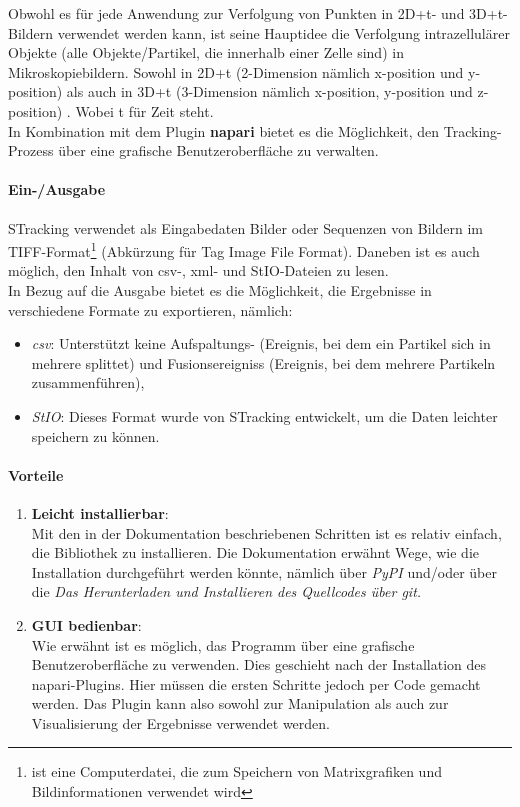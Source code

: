 Obwohl es für jede Anwendung zur Verfolgung von Punkten in 2D+t- und 3D+t-Bildern verwendet werden kann, ist seine Hauptidee die Verfolgung intrazellulärer Objekte (alle Objekte/Partikel, die innerhalb einer Zelle sind) in Mikroskopiebildern. Sowohl in 2D+t (2-Dimension nämlich x-position und y-position) als auch in 3D+t (3-Dimension nämlich x-position, y-position und z-position) \cite{prigent_2020}. Wobei t für Zeit steht.\\
In Kombination mit dem Plugin \textbf{napari}\cite{prigent_2021_napari} bietet es die Möglichkeit, den Tracking-Prozess über eine grafische Benutzeroberfläche zu verwalten.


\paragraph{Ein-/Ausgabe \\} 
    STracking verwendet als Eingabedaten Bilder oder Sequenzen von Bildern im TIFF-Format\footnote{ist eine Computerdatei, die zum Speichern von Matrixgrafiken und Bildinformationen verwendet wird} (Abkürzung für Tag Image File Format). Daneben ist es auch möglich, den Inhalt von csv-, xml- und StIO-Dateien zu lesen.\\

In Bezug auf die Ausgabe bietet es die Möglichkeit, die Ergebnisse in verschiedene Formate zu exportieren, nämlich:
\begin{itemize}
\item \textit{csv}: Unterstützt keine Aufspaltungs- (Ereignis, bei dem ein Partikel sich in mehrere splittet) und Fusionsereigniss (Ereignis, bei dem mehrere Partikeln zusammenführen),
\item \textit{StIO}: Dieses Format wurde von STracking entwickelt, um die Daten leichter speichern zu können.
\end{itemize}

	\paragraph{Vorteile}
		\begin{enumerate}
    			\item \textbf{Leicht installierbar}:\\
				Mit den in der Dokumentation beschriebenen Schritten ist es relativ einfach, die Bibliothek zu installieren. Die Dokumentation erwähnt Wege, wie die Installation durchgeführt werden könnte, nämlich über \textit{PyPI} und/oder über die \textit{Das Herunterladen und Installieren des Quellcodes über git.}

    			\item \textbf{GUI bedienbar}:\\
				Wie erwähnt ist es möglich, das Programm über eine grafische Benutzeroberfläche zu verwenden. Dies geschieht nach der Installation des napari-Plugins.
Hier müssen die ersten Schritte jedoch per Code gemacht werden. 
Das Plugin kann also sowohl zur Manipulation als auch zur Visualisierung der Ergebnisse verwendet werden. 
		\end{enumerate}
		

